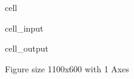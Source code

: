 \documentclass[letterpaper,10pt,english]{jupyterBook}
\begin{document}
\begin{sphinxuseclass}{cell}\begin{sphinxVerbatimInput}

\begin{sphinxuseclass}{cell_input}
\begin{sphinxVerbatim}[commandchars=\\\{\}]
\end{sphinxVerbatim}

\end{sphinxuseclass}\end{sphinxVerbatimInput}
\begin{sphinxVerbatimOutput}

\begin{sphinxuseclass}{cell_output}
\begin{sphinxVerbatim}[commandchars=\\\{\}]
\PYGZlt{}Figure size 1100x600 with 1 Axes\PYGZgt{}
\end{sphinxVerbatim}

\end{sphinxuseclass}\end{sphinxVerbatimOutput}

\end{sphinxuseclass}
\sphinxstepscope
\end{document}
